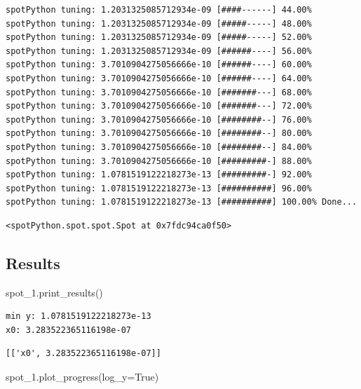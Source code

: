 \documentclass[
  letterpaper,
  DIV=11,
  numbers=noendperiod]{scrreprt}
\newenvironment{Shaded}{\begin{snugshade}}{\end{snugshade}}
\newcommand{\NormalTok}[1]{\textcolor[rgb]{0.00,0.23,0.31}{#1}}
\newcommand{\OperatorTok}[1]{\textcolor[rgb]{0.37,0.37,0.37}{#1}}
\newcommand{\VariableTok}[1]{\textcolor[rgb]{0.07,0.07,0.07}{#1}}
\begin{document}
\begin{verbatim}
spotPython tuning: 1.2031325085712934e-09 [####------] 44.00% 
spotPython tuning: 1.2031325085712934e-09 [#####-----] 48.00% 
spotPython tuning: 1.2031325085712934e-09 [#####-----] 52.00% 
spotPython tuning: 1.2031325085712934e-09 [######----] 56.00% 
spotPython tuning: 3.7010904275056666e-10 [######----] 60.00% 
spotPython tuning: 3.7010904275056666e-10 [######----] 64.00% 
spotPython tuning: 3.7010904275056666e-10 [#######---] 68.00% 
spotPython tuning: 3.7010904275056666e-10 [#######---] 72.00% 
spotPython tuning: 3.7010904275056666e-10 [########--] 76.00% 
spotPython tuning: 3.7010904275056666e-10 [########--] 80.00% 
spotPython tuning: 3.7010904275056666e-10 [########--] 84.00% 
spotPython tuning: 3.7010904275056666e-10 [#########-] 88.00% 
spotPython tuning: 1.0781519122218273e-13 [#########-] 92.00% 
spotPython tuning: 1.0781519122218273e-13 [##########] 96.00% 
spotPython tuning: 1.0781519122218273e-13 [##########] 100.00% Done...
\end{verbatim}

\begin{verbatim}
<spotPython.spot.spot.Spot at 0x7fdc94ca0f50>
\end{verbatim}

\subsection{Results}\label{results-6}

\begin{Shaded}
\begin{Highlighting}[]
\NormalTok{spot\_1.print\_results()}
\end{Highlighting}
\end{Shaded}

\begin{verbatim}
min y: 1.0781519122218273e-13
x0: 3.283522365116198e-07
\end{verbatim}

\begin{verbatim}
[['x0', 3.283522365116198e-07]]
\end{verbatim}

\begin{Shaded}
\begin{Highlighting}[]
\NormalTok{spot\_1.plot\_progress(log\_y}\OperatorTok{=}\VariableTok{True}\NormalTok{)}
\end{Highlighting}
\end{Shaded}
\end{document}
